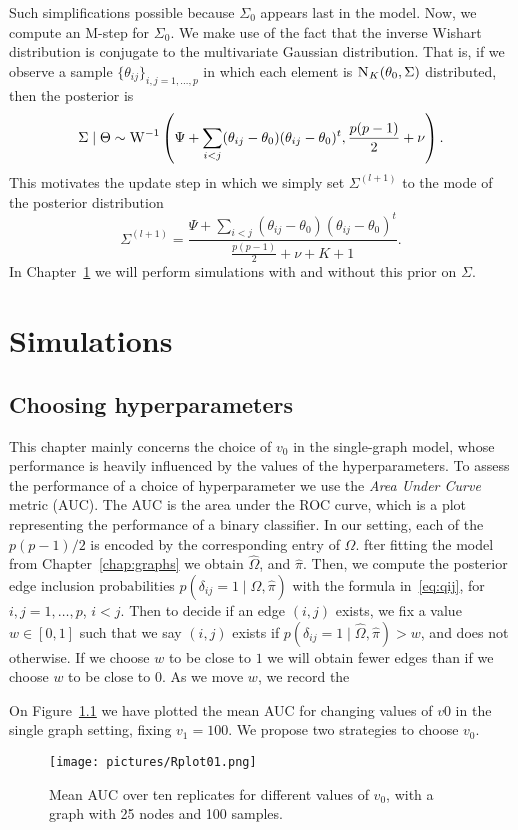 \documentclass[a4paper, 11pt, oneside]{report}
\newcommand{\1}{\mathds{1}}
\newcommand{\inv}{^{-1}}
\newcommand{\Nor}{\textsc{N}}
\begin{document}
Such simplifications possible because $\Sigma_0$ appears last in the model.
Now, we compute an M-step for $\Sigma_0$.
We make use of the fact that the inverse Wishart distribution is conjugate to the multivariate Gaussian distribution.
That is, if we observe a sample $\{\theta_{ij}\}_{i,j=1,\dots,p}$ in which each element
is $\Nor_K (\theta_0, \Sigma)$ distributed, then the posterior is
\[\Sigma \mid \Theta \sim \textsc{W}\inv\left(\Psi + \sum_{i < j} (\theta_{ij} - \theta_0)(\theta_{ij} - \theta_0)^t , \frac{p(p-1)}{2} + \nu\right).\]
This motivates the update step in which we simply set $\Sigma^{(l+1)}$ to the mode of the posterior distribution
\[\Sigma^{(l+1)} = \frac{\Psi + \sum_{i < j} (\theta_{ij} - \theta_0)(\theta_{ij} - \theta_0)^t}{\frac{p(p-1)}{2} + \nu + K + 1}.\]
In Chapter~\ref{chap:simualtions} we will perform simulations with and without this prior on $\Sigma$.


\chapter{Simulations}\label{chap:simualtions}

\section{Choosing hyperparameters}\label{sec:hyperparameters}
This chapter mainly concerns the choice of $v_0$ in the single-graph model,
whose performance is heavily influenced by the values of the
hyperparameters.
To assess the performance of a choice of hyperparameter we use the \emph{Area Under Curve} metric (AUC).
The AUC is the area under the ROC curve, which is a plot representing the performance of a binary classifier. In our setting, each of the $p(p-1)/2$ is encoded by the corresponding entry of $\Omega$.
fter fitting the model from Chapter~\ref{chap:graphs} we obtain $\hat\Omega$, and $\hat\pi$.
Then, we compute the posterior edge inclusion probabilities $p(\delta_{ij} = 1 \mid \hat \Omega, \hat \pi)$ with the formula in~\eqref{eq:qij}, for $i,j=1,\dots,p$, $i < j$.
Then to decide if an edge $(i,j)$ exists, we fix a value $w \in [0,1]$ such that we say
$(i,j)$ exists if $p(\delta_{ij} = 1 \mid \hat\Omega, \hat\pi) > w$, and does not otherwise.
If we choose $w$ to be close to $1$ we will obtain fewer edges than if we choose $w$ to be close to $0$.
As we move $w$, we record the

On Figure~\ref{fig:mean_auc} we have plotted the mean AUC for
changing values of $v0$ in the single graph setting, fixing $v_1 = 100$.
We propose two strategies to choose $v_0$.
\begin{figure}[ht]
	\centering
	\texttt{[image: pictures/Rplot01.png]}
	\caption{Mean AUC over ten replicates for different values of $v_0$, with a
		graph with 25 nodes and 100 samples.}\label{fig:mean_auc}
\end{figure}
\end{document}
